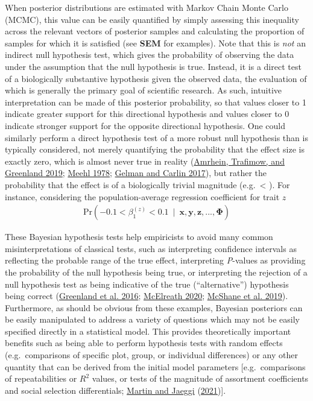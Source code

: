 \documentclass{article}
\begin{document}
When posterior distributions are estimated with Markov Chain Monte Carlo
(MCMC), this value can be easily quantified by simply assessing this
inequality across the relevant vectors of posterior samples and
calculating the proportion of samples for which it is satisfied (see
\textbf{SEM} for examples). Note that this is \emph{not} an indirect
null hypothesis test, which gives the probability of observing the data
under the assumption that the null hypothesis is true. Instead, it is a
direct test of a biologically substantive hypothesis given the observed
data, the evaluation of which is generally the primary goal of
scientific research. As such, intuitive interpretation can be made of
this posterior probability, so that values closer to 1 indicate greater
support for this directional hypothesis and values closer to 0 indicate
stronger support for the opposite directional hypothesis. One could
similarly perform a direct hypothesis test of a more robust null
hypothesis than is typically considered, not merely quantifying the
probability that the effect size is exactly zero, which is almost never
true in reality (\protect\hyperlink{ref-Amrhein2019}{Amrhein, Trafimow,
and Greenland 2019}; \protect\hyperlink{ref-Meehl1978}{Meehl 1978};
\protect\hyperlink{ref-Gelman2017}{Gelman and Carlin 2017}), but rather
the probability that the effect is of a biologically trivial magnitude
(e.g.~\textless{} \textbar). For instance, considering the
population-average regression coefficient for trait \(z\)
\begin{align} \tag{2.3}\label{eq:2.3}
\mathrm{Pr}\left( -0.1 < \beta_1^{(z)}  < 0.1  \ \mid \ \boldsymbol{x},\boldsymbol{y},\boldsymbol{z},...,\boldsymbol{\Phi} \right)
\end{align}

These Bayesian hypothesis tests help empiricists to avoid many common
misinterpretations of classical tests, such as interpreting confidence
intervals as reflecting the probable range of the true effect,
interpreting \emph{P}-values as providing the probability of the null
hypothesis being true, or interpreting the rejection of a null
hypothesis test as being indicative of the true (``alternative'')
hypothesis being correct (\protect\hyperlink{ref-Green2016}{Greenland et
al. 2016}; \protect\hyperlink{ref-Rethinking}{McElreath 2020};
\protect\hyperlink{ref-McShane2019}{McShane et al. 2019}). Furthermore,
as should be obvious from these examples, Bayesian posteriors can be
easily manipulated to address a variety of questions which may not be
easily specified directly in a statistical model. This provides
theoretically important benefits such as being able to perform
hypothesis tests with random effects (e.g.~comparisons of specific plot,
group, or individual differences) or any other quantity that can be
derived from the initial model parameters {[}e.g.~comparisons of
repeatabilities or \(R^2\) values, or tests of the magnitude of
assortment coefficients and social selection differentials;
\protect\hyperlink{ref-Martin2021}{Martin and Jaeggi}
(\protect\hyperlink{ref-Martin2021}{2021}){]}.
\end{document}
